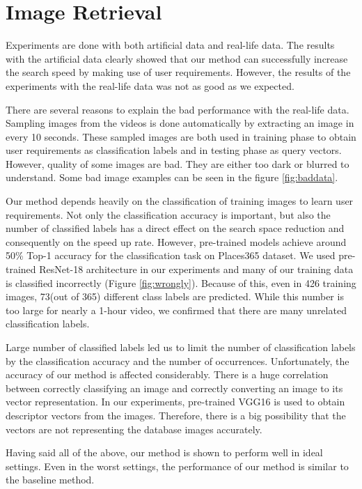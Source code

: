 \section*{Image Retrieval}

Experiments are done with both artificial data and real-life data. 
The results with the artificial data clearly showed that our method can successfully increase the search speed by making use of user requirements.
However, the results of the experiments with the real-life data was not as good as we expected. 

There are several reasons to explain the bad performance with the real-life data. 
Sampling images from the videos is done automatically by extracting an image in every 10 seconds. 
These sampled images are both used in training phase to obtain user requirements as classification labels and in testing phase as query vectors.
However, quality of some images are bad. They are either too dark or blurred to understand. Some bad image examples can be seen in the figure \ref{fig:baddata}.

Our method depends heavily on the classification of training images to learn user requirements. 
Not only the classification accuracy is important, but also the number of classified labels has a direct effect on the search space reduction and consequently on the speed up rate.
However, pre-trained models achieve around 50\% Top-1 accuracy for the classification task on Places365 dataset.
We used pre-trained ResNet-18 architecture in our experiments and many of our training data is classified incorrectly (Figure \ref{fig:wrongly}).
Because of this, even in 426 training images, 73(out of 365) different class labels are predicted. 
While this number is too large for nearly a 1-hour video, we confirmed that there are many unrelated classification labels.

Large number of classified labels led us to limit the number of classification labels by the classification accuracy and the number of occurrences.
Unfortunately, the accuracy of our method is affected considerably.
There is a huge correlation between correctly classifying an image and correctly converting an image to its vector representation.
In our experiments, pre-trained VGG16 is used to obtain descriptor vectors from the images.
Therefore, there is a big possibility that the vectors are not representing the database images accurately.

Having said all of the above, our method is shown to perform well in ideal settings. 
Even in the worst settings, the performance of our method is similar to the baseline method. 


